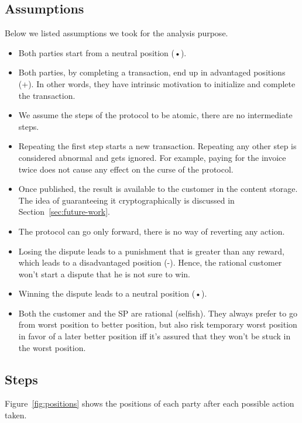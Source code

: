 \documentclass{ieeeaccess}
\begin{document}
\subsection{Assumptions}\label{assumptions}

Below  we listed
assumptions we took
for the analysis purpose.  

\begin{itemize}

\item
  Both parties start from a neutral position (•).
\item
  Both parties, by completing a transaction, end up in advantaged positions (+). In other words, they have intrinsic motivation to initialize and complete the transaction.
\item
  We assume the steps of the protocol to be atomic, there are no intermediate steps.
\item
  Repeating the first step starts a new transaction. Repeating any other step is considered abnormal and gets ignored. For example, paying for the invoice twice does not cause any effect on the curse of the protocol.
\item
  Once published, the result is available to the customer in the content storage. The idea of guaranteeing it cryptographically is discussed in Section~\ref{sec:future-work}.
  
  
\item
  The protocol can go only forward, there is no way of reverting any action.
\item
  Losing the dispute leads to a punishment that is greater than any reward, which leads to a disadvantaged position (-). Hence, the rational customer won't start a dispute that he is not sure to win.
\item
  Winning the dispute leads to a neutral position (•).
\item
  Both the customer and the SP are rational (selfish). They always prefer to go from worst position to better position, but also risk temporary worst position in favor of a later better position iff it's assured that they won't be stuck in the worst position.
\end{itemize}

\subsection{Steps}\label{steps}

Figure~\ref{fig:positions} 
shows the positions of each party after each possible action taken.
\end{document}

